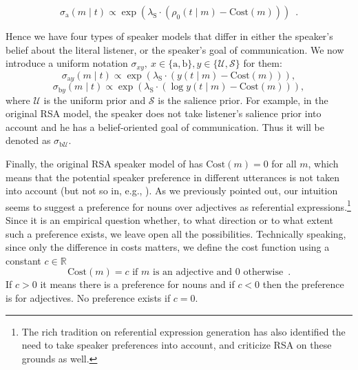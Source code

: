 \begin{equation} \label{Bayesian_speaker_action}
\sigma_\mathrm{a}(m \mid t) \propto \exp(\lambda_\mathrm{S} \cdot (\rho_0(t\mid m)-\mbox{Cost}(m))) \enspace .
\end{equation}

Hence we have four types of speaker models that differ in either the speaker's belief about the literal listener, or the speaker's goal of communication. We now introduce a uniform notation $\sigma_{xy},\ x\in\{\mathrm{a},\mathrm{b}\},y\in\{\mathcal{U},\mathcal{S}\}$ for them:
\begin{equation} \label{Bayesian_speaker_uniform_action}
\sigma_{\mathrm{a}y}(m \mid t) \propto \exp(\lambda_\mathrm{S} \cdot ( y(t\mid m)-\mbox{Cost}(m))),
\end{equation}
\begin{equation} \label{Bayesian_speaker_uniform_belief}
\sigma_{\mathrm{b}y}(m \mid t) \propto \exp(\lambda_\mathrm{S} \cdot (\log y(t\mid m)-\mbox{Cost}(m))),
\end{equation}
where $\mathcal{U}$ is the uniform prior and $\mathcal{S}$ is the
salience prior. For example, in the original RSA model, the speaker
does not take listener's salience prior into account and he has a
belief-oriented goal of communication. Thus it will be denoted as
$\sigma_{\mathrm{b}\mathcal{U}}$.

Finally, the original RSA speaker model of \cite{Frank} has
$\mbox{Cost}(m)=0$ for all $m$, which means that the potential speaker
preference in different utterances is not taken into account (but not
so in, e.g., \cite{Bergen2012}). As we previously pointed out, our
intuition seems to suggest a preference for nouns over adjectives as
referential expressions.\footnote{The rich tradition on referential
  expression generation \cite{KramerDeemter2012:Computational-G} has
  also identified the need to take speaker preferences into account,
  and \cite{GattGompel2013:Are-we-Bayesian} criticize RSA on these
  grounds as well.} Since it is an empirical question whether, to what
direction or to what extent such a preference exists, we leave open
all the possibilities. Technically speaking, since only the difference
in costs matters, we define the cost function using a constant $c\in
\mathbb{R}$
\begin{equation} \label{cost}
\mbox{Cost}(m)=c \mbox{ if } m \mbox{ is an adjective and }0 \mbox{ otherwise} \enspace . 
\end{equation}
If $c>0$ it means there is a preference for nouns and if $c<0$ then the preference is for adjectives. No preference exists if $c=0$.

